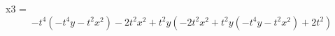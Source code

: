 \documentclass{article}
\begin{document}
x3 = 
    $$ - t^{4} \left(- t^{4} y - t^{2} x^{2}\right) - 2 t^{2} x^{2} + t^{2} y \left(- 2 t^{2} x^{2} + t^{2} y \left(- t^{4} y - t^{2} x^{2}\right) + 2 t^{2}\right) $$
    
\end{document}
